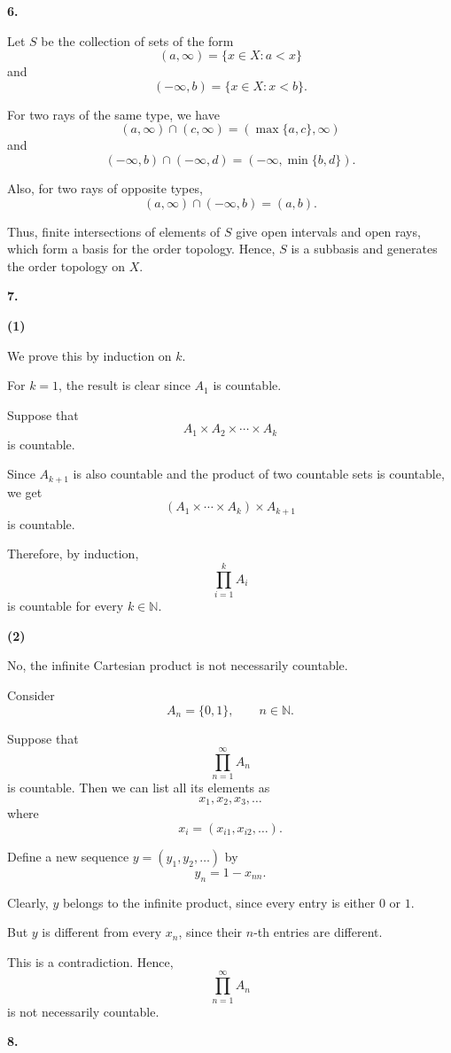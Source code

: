 \textbf{6.}

Let $S$ be the collection of sets of the form
\[
(a,\infty)=\{x\in X:a<x\}
\]
and
\[
(-\infty,b)=\{x\in X:x<b\}.
\]

For two rays of the same type, we have
\[
(a,\infty)\cap(c,\infty)
=(\max\{a,c\},\infty)
\]
and
\[
(-\infty,b)\cap(-\infty,d)
=(-\infty,\min\{b,d\}).
\]

Also, for two rays of opposite types,
\[
(a,\infty)\cap(-\infty,b)=(a,b).
\]

Thus, finite intersections of elements of $S$ give
open intervals and open rays, which form a basis
for the order topology. Hence, $S$ is a subbasis
and generates the order topology on $X$.

\bigskip

\textbf{7.}

\textbf{(1)}

We prove this by induction on $k$.

For $k=1$, the result is clear since $A_1$ is
countable.

Suppose that
\[
A_1\times A_2\times\cdots\times A_k
\]
is countable.

Since $A_{k+1}$ is also countable and the product
of two countable sets is countable, we get
\[
(A_1\times\cdots\times A_k)\times A_{k+1}
\]
is countable.

Therefore, by induction,
\[
\prod_{i=1}^{k}A_i
\]
is countable for every $k\in\mathbb N$.

\medskip

\textbf{(2)}

No, the infinite Cartesian product is not
necessarily countable.

Consider
\[
A_n=\{0,1\},\qquad n\in\mathbb N.
\]

Suppose that
\[
\prod_{n=1}^{\infty}A_n
\]
is countable. Then we can list all its elements as
\[
x_1,x_2,x_3,\ldots
\]
where
\[
x_i=(x_{i1},x_{i2},\ldots).
\]

Define a new sequence $y=(y_1,y_2,\ldots)$ by
\[
y_n=1-x_{nn}.
\]

Clearly, $y$ belongs to the infinite product,
since every entry is either $0$ or $1$.

But $y$ is different from every $x_n$, since
their $n$-th entries are different.

This is a contradiction. Hence,
\[
\prod_{n=1}^{\infty}A_n
\]
is not necessarily countable.

\bigskip

\textbf{8.}

